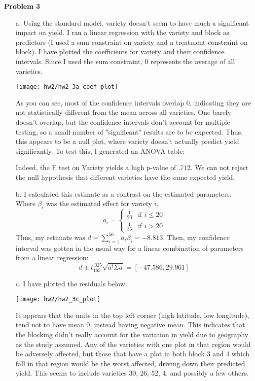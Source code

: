 \documentclass[11pt]{article}
\theoremstyle{definition}
\begin{document}
{\bf Problem 3}
\begin{itemize}
    \item[a.]
        Using the standard model, variety doesn't seem to have much a significant impact on yield. I ran a linear regression with the variety and block as predictors (I used a sum constraint on variety and a treatment constraint on block). I have plotted the coefficients for variety and their confidence intervals. Since I used the sum constraint, $0$ represents the average of all varieties.
            \begin{center}
                \texttt{[image: hw2/hw2\_3a\_coef\_plot]}
            \end{center}
        As you can see, most of the confidence intervals overlap $0$, indicating they are not statistically different from the mean across all varieties. One barely doesn't overlap, but the confidence intervals don't account for multiple testing, so a small number of "significant" results are to be expected. Thus, this appears to be a null plot, where variety doesn't actually predict yield significantly. To test this, I generated an ANOVA table:
            \FloatBarrier
             
            \FloatBarrier
        Indeed, the F test on Variety yields a high p-value of $.712$. We can not reject the null hypothesis that different varieties have the same expected yield.
    \item[b.]
        I calculated this estimate as a contrast on the estimated parameters. Where $\beta_i$ was the estimated effect for variety $i$, 
        \[ a_i = \begin{cases} \frac{1}{20} &\mbox{if } i\leq20 \\ 
                               \frac{1}{36} &\mbox{if } i>20 \end{cases} \]
        Thus, my estimate was \(d=\sum_{i=1}^{56} a_i \beta_i=-8.813\). Then, my confidence interval was gotten in the usual way for a linear combination of parameters from a linear regression:
        \[ d\pm t_{165}^{.025} \sqrt{a^t \Sigma a} = [-47.586,29.961] \]
    \item[c.]
        I have plotted the residuals below:
            \begin{center}
                \texttt{[image: hw2/hw2\_3c\_plot]}
            \end{center}
            It appears that the units in the top left corner (high latitude, low longitude), tend not to have mean 0, instead having negative mean. This indicates that the blocking didn't really account for the variation in yield due to geography as the study assumed. Any of the varieties with one plot in that region would be adversely affected, but those that have a plot in both block 3 and 4 which fall in that region would be the worst affected, driving down their predicted yield. This seems to include varieties 30, 26, 52, 4, and possibly a few others.

\end{itemize}
\end{document}
